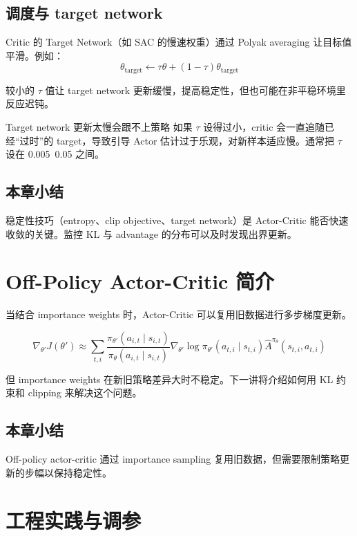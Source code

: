 \documentclass[a4paper]{article}
\begin{document}
\subsection{调度与 target network}

Critic 的 Target Network（如 SAC 的慢速权重）通过 Polyak averaging 让目标值平滑。例如：
$$\theta_{\text{target}} \leftarrow \tau \theta + (1 - \tau) \theta_{\text{target}}$$

较小的 $\tau$ 值让 target network 更新缓慢，提高稳定性，但也可能在非平稳环境里反应迟钝。

\begin{warningbox}{Target network 更新太慢会跟不上策略}
如果 $\tau$ 设得过小，critic 会一直追随已经“过时”的 target，导致引导 Actor 估计过于乐观，对新样本适应慢。通常把 $\tau$ 设在 0.005~0.05 之间。
\end{warningbox}

\subsection{本章小结}

稳定性技巧（entropy、clip objective、target network）是 Actor-Critic 能否快速收敛的关键。监控 KL 与 advantage 的分布可以及时发现出界更新。

\section{Off-Policy Actor-Critic 简介}

当结合 importance weights 时，Actor-Critic 可以复用旧数据进行多步梯度更新。

$$\nabla_{\theta'} J(\theta') \approx \sum_{t,i} \frac{\pi_{\theta'}(a_{i,t} \mid s_{i,t})}{\pi_\theta(a_{i,t} \mid s_{i,t})} \nabla_{\theta'} \log \pi_{\theta'}(a_{t,i} \mid s_{t,i}) \hat{A}^{\pi_\theta}(s_{t,i}, a_{t,i})$$

但 importance weights 在新旧策略差异大时不稳定。下一讲将介绍如何用 KL 约束和 clipping 来解决这个问题。

\subsection{本章小结}

Off-policy actor-critic 通过 importance sampling 复用旧数据，但需要限制策略更新的步幅以保持稳定性。

\section{工程实践与调参}
\end{document}
